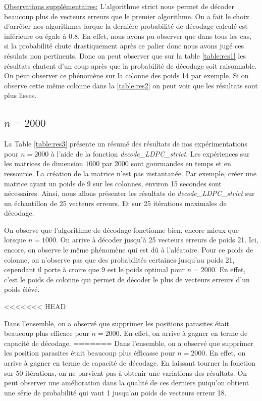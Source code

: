 \documentclass[french,nochapter,11pt]{rapportUB}
\begin{document}
\underline{Observations supplémentaires:} L'algorithme strict nous permet de décoder beaucoup plus de vecteurs erreurs que le premier algorithme. On a fait le choix d'arrêter nos algorithmes
lorque la dernière probabilité de décodage calculé est inférieure ou égale à 0.8. En effet, nous avons pu observer que dans tous les cas, si la probabilité chute drastiquement
après ce palier donc nous avons jugé ces résulats non pertinents. Donc on peut observer que sur la table \ref{table:res1} les résultats chutent d'un coup après que la probabilité de décodage soit 
raisonnable. On peut observer ce phénomène sur la colonne des poids 14 par exemple. Si on observe cette même colonne dans la \ref{table:res2} on peut voir que les résultats sont plus lisses.

\subsection{$n = 2000$}
La Table \ref{table:res3} présente un résumé des résultats de nos expérimentations pour $n=2000$ à l'aide de la fonction
\textit{decode\_LDPC\_strict}.\vspace{0.4cm}\newline
Les expériences sur les matrices de dimension $1000$ par $2000$ sont gourmandes en temps et en ressource. La création de la matrice n'est pas instantanée. Par exemple, créer une matrice ayant un poids de 9 sur les colonnes, environ 15 secondes sont nécessaires. 
Ainsi, nous allons présenter 
les résultats de \textit{decode\_LDPC\_strict} sur un échantillon de 25 vecteurs erreurs. Et sur 25 itérations maximales de décodage.\vspace{0.4cm}\newline

On observe que l'algorithme de décodage fonctionne bien, encore mieux que lorsque $n=1000$. On arrive à décoder jusqu'à 25 vecteurs erreurs de poids 21. Ici, encore, on observe le même phénomène qui est 
dû à l'aléatoire. Pour ce poids de colonne, on n'observe pas que des probabilités certaines jusqu'au poids 21, cependant il porte à croire que 9 est le poids optimal pour 
$n = 2000$. En effet, c'est le poids de colonne qui permet de décoder le plus de vecteurs erreurs d'un poids élévé.\vspace{0.4cm}\newline

<<<<<<< HEAD

Dans l'ensemble, on a observé que supprimer les positions parasites était beaucoup plus efficace pour $n=2000$. En effet, on arrive à gagner en terme de capacité de décodage.
=======
Dans l'ensemble, on a observé que supprimer les position parasites était beaucoup plus éfficasse pour $n=2000$. En effet, on arrive à gagner en terme de capacité de décodage.
En laissant tourner la fonction sur 50 itérations, on ne parvient pas à obtenir une variations des résultats. On peut observer une amélioration dans la qualité de ces derniers puiqu'on obtient
une série de probabilité qui vaut 1 jusqu'au poids de vecteurs erreur 18.
\end{document}
